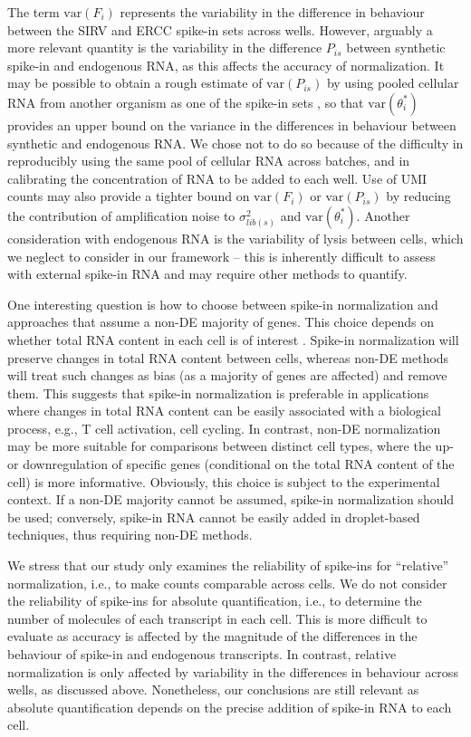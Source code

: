 \documentclass{article}
\newcommand\variance{\mbox{var}}
\begin{document}
The term $\variance(F_i)$ represents the variability in the difference in behaviour between the SIRV and ERCC spike-in sets across wells.
However, arguably a more relevant quantity is the variability in the difference $P_{is}$ between synthetic spike-in and endogenous RNA, as this affects the accuracy of normalization.
It may be possible to obtain a rough estimate of $\variance(P_{is})$ by using pooled cellular RNA from another organism as one of the spike-in sets \autocite{brennecke2013accounting}, so that $\variance(\theta^*_i)$ provides an upper bound on the variance in the differences in behaviour between synthetic and endogenous RNA.
We chose not to do so because of the difficulty in reproducibly using the same pool of cellular RNA across batches, and in calibrating the concentration of RNA to be added to each well.
Use of UMI counts may also provide a tighter bound on $\variance(F_i)$ or $\variance(P_{is})$ by reducing the contribution of amplification noise to $\sigma^2_{lib(s)}$ and $\variance(\theta^*_i)$.
Another consideration with endogenous RNA is the variability of lysis between cells, which we neglect to consider in our framework -- this is inherently difficult to assess with external spike-in RNA and may require other methods to quantify.

One interesting question is how to choose between spike-in normalization and approaches that assume a non-DE majority of genes.
This choice depends on whether total RNA content in each cell is of interest \autocite{lun2016stepbystep}.
Spike-in normalization will preserve changes in total RNA content between cells, whereas non-DE methods will treat such changes as bias (as a majority of genes are affected) and remove them.
This suggests that spike-in normalization is preferable in applications where changes in total RNA content can be easily associated with a biological process, e.g., T cell activation,   cell cycling.
In contrast, non-DE normalization may be more suitable for comparisons between distinct cell types, where the up- or downregulation of specific genes (conditional on the total RNA content of the cell) is more informative.
Obviously, this choice is subject to the experimental context.
If a non-DE majority cannot be assumed, spike-in normalization should be used; conversely, spike-in RNA cannot be easily added in droplet-based techniques, thus requiring non-DE methods.

We stress that our study only examines the reliability of spike-ins for ``relative'' normalization, i.e., to make counts comparable across cells.
We do not consider the reliability of spike-ins for absolute quantification, i.e., to determine the number of molecules of each transcript in each cell.
This is more difficult to evaluate as accuracy is affected by the magnitude of the differences in the behaviour of spike-in and endogenous transcripts.
In contrast, relative normalization is only affected by variability in the differences in behaviour across wells, as discussed above.
Nonetheless, our conclusions are still relevant as absolute quantification depends on the precise addition of spike-in RNA to each cell.
\end{document}
